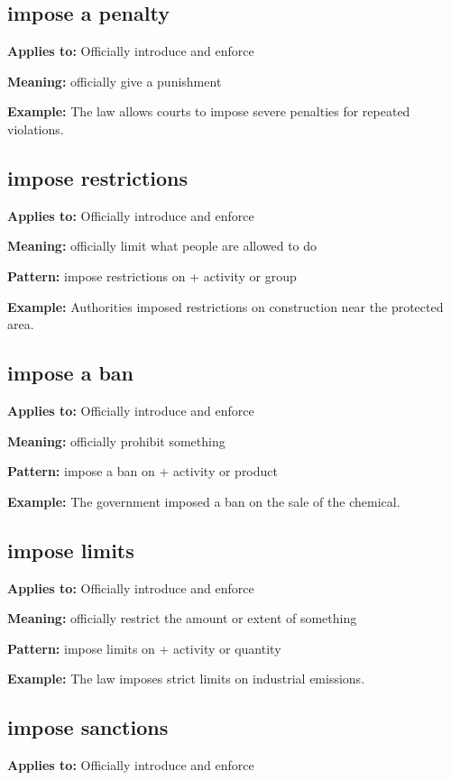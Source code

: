 \documentclass[11pt]{article}
\begin{document}
\subsection{impose a penalty}
\textbf{Applies to:} Officially introduce and enforce

\textbf{Meaning:} officially give a punishment

\textbf{Example:} The law allows courts to impose severe penalties for repeated violations.

\subsection{impose restrictions}
\textbf{Applies to:} Officially introduce and enforce

\textbf{Meaning:} officially limit what people are allowed to do

\textbf{Pattern:} impose restrictions on + activity or group

\textbf{Example:} Authorities imposed restrictions on construction near the protected area.

\subsection{impose a ban}
\textbf{Applies to:} Officially introduce and enforce

\textbf{Meaning:} officially prohibit something

\textbf{Pattern:} impose a ban on + activity or product

\textbf{Example:} The government imposed a ban on the sale of the chemical.

\subsection{impose limits}
\textbf{Applies to:} Officially introduce and enforce

\textbf{Meaning:} officially restrict the amount or extent of something

\textbf{Pattern:} impose limits on + activity or quantity

\textbf{Example:} The law imposes strict limits on industrial emissions.

\subsection{impose sanctions}
\textbf{Applies to:} Officially introduce and enforce
\end{document}
